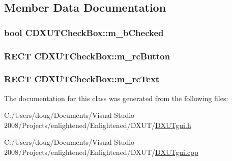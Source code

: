 \subsection{Member Data Documentation}
\hypertarget{class_c_d_x_u_t_check_box_ac2d09bf808d218c90f013d5f0ea5cfa0}{
\subsubsection[{m\_\-bChecked}]{\setlength{\rightskip}{0pt plus 5cm}bool {\bf CDXUTCheckBox::m\_\-bChecked}}}
\label{class_c_d_x_u_t_check_box_ac2d09bf808d218c90f013d5f0ea5cfa0}
\hypertarget{class_c_d_x_u_t_check_box_a9629eb23cf728bccd8e5850e2e49e74d}{
\subsubsection[{m\_\-rcButton}]{\setlength{\rightskip}{0pt plus 5cm}RECT {\bf CDXUTCheckBox::m\_\-rcButton}}}
\label{class_c_d_x_u_t_check_box_a9629eb23cf728bccd8e5850e2e49e74d}
\hypertarget{class_c_d_x_u_t_check_box_af80193c178d600a91d9a8a53b1f852c7}{
\subsubsection[{m\_\-rcText}]{\setlength{\rightskip}{0pt plus 5cm}RECT {\bf CDXUTCheckBox::m\_\-rcText}}}
\label{class_c_d_x_u_t_check_box_af80193c178d600a91d9a8a53b1f852c7}


The documentation for this class was generated from the following files:\begin{DoxyCompactItemize}
\item 
C:/Users/doug/Documents/Visual Studio 2008/Projects/enlightened/Enlightened/DXUT/\hyperlink{_d_x_u_tgui_8h}{DXUTgui.h}\item 
C:/Users/doug/Documents/Visual Studio 2008/Projects/enlightened/Enlightened/DXUT/\hyperlink{_d_x_u_tgui_8cpp}{DXUTgui.cpp}\end{DoxyCompactItemize}
